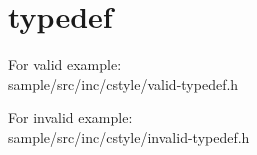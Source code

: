 \section{typedef}

\begin{crules}
\end{crules}

For valid example:\\

{sample/src/inc/cstyle/valid-typedef.h}

For invalid example:\\

{sample/src/inc/cstyle/invalid-typedef.h}
